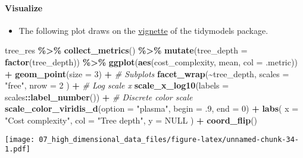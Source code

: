 \documentclass[
]{book}
\newenvironment{Shaded}{\begin{snugshade}}{\end{snugshade}}
\newcommand{\CommentTok}[1]{\textcolor[rgb]{0.56,0.35,0.01}{\textit{#1}}}
\newcommand{\DataTypeTok}[1]{\textcolor[rgb]{0.13,0.29,0.53}{#1}}
\newcommand{\DecValTok}[1]{\textcolor[rgb]{0.00,0.00,0.81}{#1}}
\newcommand{\FloatTok}[1]{\textcolor[rgb]{0.00,0.00,0.81}{#1}}
\newcommand{\KeywordTok}[1]{\textcolor[rgb]{0.13,0.29,0.53}{\textbf{#1}}}
\newcommand{\NormalTok}[1]{#1}
\newcommand{\OperatorTok}[1]{\textcolor[rgb]{0.81,0.36,0.00}{\textbf{#1}}}
\newcommand{\OtherTok}[1]{\textcolor[rgb]{0.56,0.35,0.01}{#1}}
\newcommand{\StringTok}[1]{\textcolor[rgb]{0.31,0.60,0.02}{#1}}
\providecommand{\tightlist}{%
  \setlength{\itemsep}{0pt}\setlength{\parskip}{0pt}}
\begin{document}
\hypertarget{visualize-1}{%
\paragraph{Visualize}\label{visualize-1}}

\begin{itemize}
\tightlist
\item
  The following plot draws on the \href{https://www.tidymodels.org/start/tuning/}{vignette} of the tidymodels package.
\end{itemize}

\begin{Shaded}
\begin{Highlighting}[]
\NormalTok{tree\_res }\OperatorTok{\%\textgreater{}\%}
\StringTok{  }\KeywordTok{collect\_metrics}\NormalTok{() }\OperatorTok{\%\textgreater{}\%}
\StringTok{  }\KeywordTok{mutate}\NormalTok{(}\DataTypeTok{tree\_depth =} \KeywordTok{factor}\NormalTok{(tree\_depth)) }\OperatorTok{\%\textgreater{}\%}
\StringTok{  }\KeywordTok{ggplot}\NormalTok{(}\KeywordTok{aes}\NormalTok{(cost\_complexity, mean, }\DataTypeTok{col =}\NormalTok{ .metric)) }\OperatorTok{+}
\StringTok{  }\KeywordTok{geom\_point}\NormalTok{(}\DataTypeTok{size =} \DecValTok{3}\NormalTok{) }\OperatorTok{+}
\StringTok{  }\CommentTok{\# Subplots}
\StringTok{  }\KeywordTok{facet\_wrap}\NormalTok{(}\OperatorTok{\textasciitilde{}}\NormalTok{tree\_depth,}
    \DataTypeTok{scales =} \StringTok{"free"}\NormalTok{,}
    \DataTypeTok{nrow =} \DecValTok{2}
\NormalTok{  ) }\OperatorTok{+}
\StringTok{  }\CommentTok{\# Log scale x}
\StringTok{  }\KeywordTok{scale\_x\_log10}\NormalTok{(}\DataTypeTok{labels =}\NormalTok{ scales}\OperatorTok{::}\KeywordTok{label\_number}\NormalTok{()) }\OperatorTok{+}
\StringTok{  }\CommentTok{\# Discrete color scale}
\StringTok{  }\KeywordTok{scale\_color\_viridis\_d}\NormalTok{(}\DataTypeTok{option =} \StringTok{"plasma"}\NormalTok{, }\DataTypeTok{begin =} \FloatTok{.9}\NormalTok{, }\DataTypeTok{end =} \DecValTok{0}\NormalTok{) }\OperatorTok{+}
\StringTok{  }\KeywordTok{labs}\NormalTok{(}
    \DataTypeTok{x =} \StringTok{"Cost complexity"}\NormalTok{,}
    \DataTypeTok{col =} \StringTok{"Tree depth"}\NormalTok{,}
    \DataTypeTok{y =} \OtherTok{NULL}
\NormalTok{  ) }\OperatorTok{+}
\StringTok{  }\KeywordTok{coord\_flip}\NormalTok{()}
\end{Highlighting}
\end{Shaded}

\texttt{[image: 07\_high\_dimensional\_data\_files/figure-latex/unnamed-chunk-34-1.pdf]}
\end{document}
